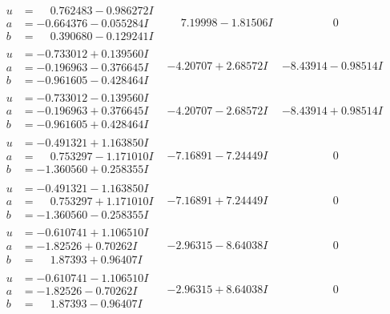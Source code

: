 \documentclass[1p]{elsarticle_modified}
\theoremstyle{definition}
\begin{document}
$$\begin{array}{c|c|c}
\begin{aligned}
u &= \phantom{-}0.762483 - 0.986272 I \\
a &= -0.664376 - 0.055284 I \\
b &= \phantom{-}0.390680 - 0.129241 I\end{aligned}
 & \phantom{-}7.19998 - 1.81506 I & \phantom{-0.000000 } 0 \\ \hline\begin{aligned}
u &= -0.733012 + 0.139560 I \\
a &= -0.196963 - 0.376645 I \\
b &= -0.961605 - 0.428464 I\end{aligned}
 & -4.20707 + 2.68572 I & -8.43914 - 0.98514 I \\ \hline\begin{aligned}
u &= -0.733012 - 0.139560 I \\
a &= -0.196963 + 0.376645 I \\
b &= -0.961605 + 0.428464 I\end{aligned}
 & -4.20707 - 2.68572 I & -8.43914 + 0.98514 I \\ \hline\begin{aligned}
u &= -0.491321 + 1.163850 I \\
a &= \phantom{-}0.753297 - 1.171010 I \\
b &= -1.360560 + 0.258355 I\end{aligned}
 & -7.16891 - 7.24449 I & \phantom{-0.000000 } 0 \\ \hline\begin{aligned}
u &= -0.491321 - 1.163850 I \\
a &= \phantom{-}0.753297 + 1.171010 I \\
b &= -1.360560 - 0.258355 I\end{aligned}
 & -7.16891 + 7.24449 I & \phantom{-0.000000 } 0 \\ \hline\begin{aligned}
u &= -0.610741 + 1.106510 I \\
a &= -1.82526 + 0.70262 I \\
b &= \phantom{-}1.87393 + 0.96407 I\end{aligned}
 & -2.96315 - 8.64038 I & \phantom{-0.000000 } 0 \\ \hline\begin{aligned}
u &= -0.610741 - 1.106510 I \\
a &= -1.82526 - 0.70262 I \\
b &= \phantom{-}1.87393 - 0.96407 I\end{aligned}
 & -2.96315 + 8.64038 I & \phantom{-0.000000 } 0 \\ \hline\begin{aligned}

\end{aligned}
\end{array}$$
\end{document}
